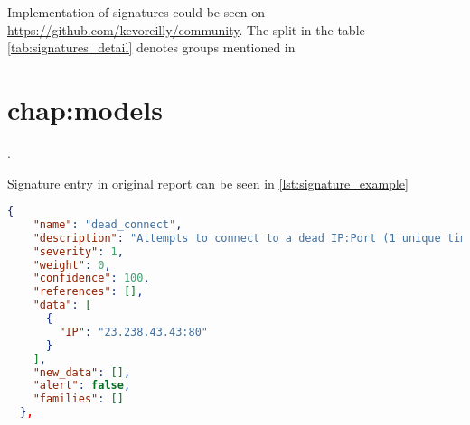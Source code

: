Implementation of signatures could be seen on \url{https://github.com/kevoreilly/community}. The split in the table \ref{tab:signatures_detail} denotes groups mentioned in \chapter{chap:models}.

Signature entry in original report can be seen in \ref{lst:signature_example}

\begin{lstlisting}[language=json, caption={Example of \emph{signature} part entries in \emph{report.json}},captionpos=b, label={lst:signature_example}]
  {
    "name": "dead_connect",
    "description": "Attempts to connect to a dead IP:Port (1 unique times)",
    "severity": 1,
    "weight": 0,
    "confidence": 100,
    "references": [],
    "data": [
      {
        "IP": "23.238.43.43:80"
      }
    ],
    "new_data": [],
    "alert": false,
    "families": []
  },
\end{lstlisting}




